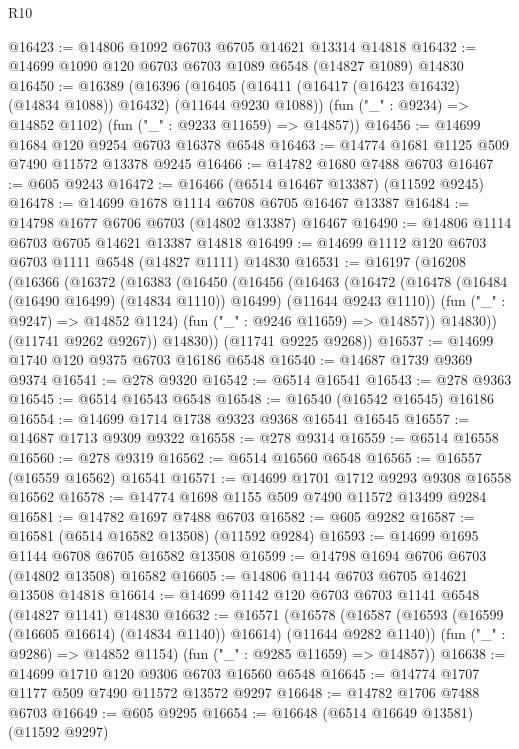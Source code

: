 \begin{lexlean}{R10}
\begin{coremodule}
@16423 := @14806 @1092 @6703 @6705 @14621 @13314 @14818
@16432 := @14699 @1090 @120 @6703 @6703 @1089 @6548 (@14827 @1089) @14830
@16450 := @16389
    (@16396
      (@16405 (@16411 (@16417 (@16423 @16432) (@14834 @1088)) @16432) (@11644 @9230 @1088))
      (fun ("_" : @9234) => @14852 @1102)
      (fun ("_" : @9233 @11659) => @14857))
@16456 := @14699 @1684 @120 @9254 @6703 @16378 @6548
@16463 := @14774 @1681 @1125 @509 @7490 @11572 @13378 @9245
@16466 := @14782 @1680 @7488 @6703
@16467 := @605 @9243
@16472 := @16466 (@6514 @16467 @13387) (@11592 @9245)
@16478 := @14699 @1678 @1114 @6708 @6705 @16467 @13387
@16484 := @14798 @1677 @6706 @6703 (@14802 @13387) @16467
@16490 := @14806 @1114 @6703 @6705 @14621 @13387 @14818
@16499 := @14699 @1112 @120 @6703 @6703 @1111 @6548 (@14827 @1111) @14830
@16531 := @16197
    (@16208
      (@16366
        (@16372
          (@16383
            (@16450
              (@16456
                (@16463
                  (@16472
                    (@16478 (@16484 (@16490 @16499) (@14834 @1110)) @16499)
                    (@11644 @9243 @1110))
                  (fun ("_" : @9247) => @14852 @1124)
                  (fun ("_" : @9246 @11659) => @14857))
                @14830))
            (@11741 @9262 @9267))
          @14830))
      (@11741 @9225 @9268))
@16537 := @14699 @1740 @120 @9375 @6703 @16186 @6548
@16540 := @14687 @1739 @9369 @9374
@16541 := @278 @9320
@16542 := @6514 @16541
@16543 := @278 @9363
@16545 := @6514 @16543 @6548
@16548 := @16540 (@16542 @16545) @16186
@16554 := @14699 @1714 @1738 @9323 @9368 @16541 @16545
@16557 := @14687 @1713 @9309 @9322
@16558 := @278 @9314
@16559 := @6514 @16558
@16560 := @278 @9319
@16562 := @6514 @16560 @6548
@16565 := @16557 (@16559 @16562) @16541
@16571 := @14699 @1701 @1712 @9293 @9308 @16558 @16562
@16578 := @14774 @1698 @1155 @509 @7490 @11572 @13499 @9284
@16581 := @14782 @1697 @7488 @6703
@16582 := @605 @9282
@16587 := @16581 (@6514 @16582 @13508) (@11592 @9284)
@16593 := @14699 @1695 @1144 @6708 @6705 @16582 @13508
@16599 := @14798 @1694 @6706 @6703 (@14802 @13508) @16582
@16605 := @14806 @1144 @6703 @6705 @14621 @13508 @14818
@16614 := @14699 @1142 @120 @6703 @6703 @1141 @6548 (@14827 @1141) @14830
@16632 := @16571
    (@16578
      (@16587 (@16593 (@16599 (@16605 @16614) (@14834 @1140)) @16614) (@11644 @9282 @1140))
      (fun ("_" : @9286) => @14852 @1154)
      (fun ("_" : @9285 @11659) => @14857))
@16638 := @14699 @1710 @120 @9306 @6703 @16560 @6548
@16645 := @14774 @1707 @1177 @509 @7490 @11572 @13572 @9297
@16648 := @14782 @1706 @7488 @6703
@16649 := @605 @9295
@16654 := @16648 (@6514 @16649 @13581) (@11592 @9297)

\end{coremodule}
\end{lexlean}
